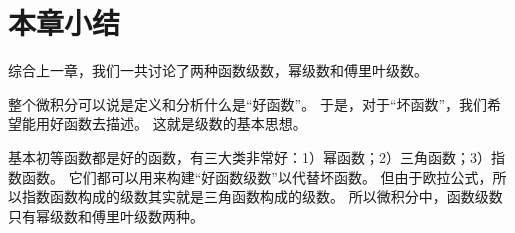 \section{本章小结}

综合上一章，我们一共讨论了两种函数级数，幂级数和傅里叶级数。

整个微积分可以说是定义和分析什么是“好函数”。
于是，对于“坏函数”，我们希望能用好函数去描述。
这就是级数的基本思想。

基本初等函数都是好的函数，有三大类非常好：1）幂函数；2）三角函数；3）指数函数。
它们都可以用来构建“好函数级数”以代替坏函数。
但由于欧拉公式，所以指数函数构成的级数其实就是三角函数构成的级数。
所以微积分中，函数级数只有幂级数和傅里叶级数两种。




